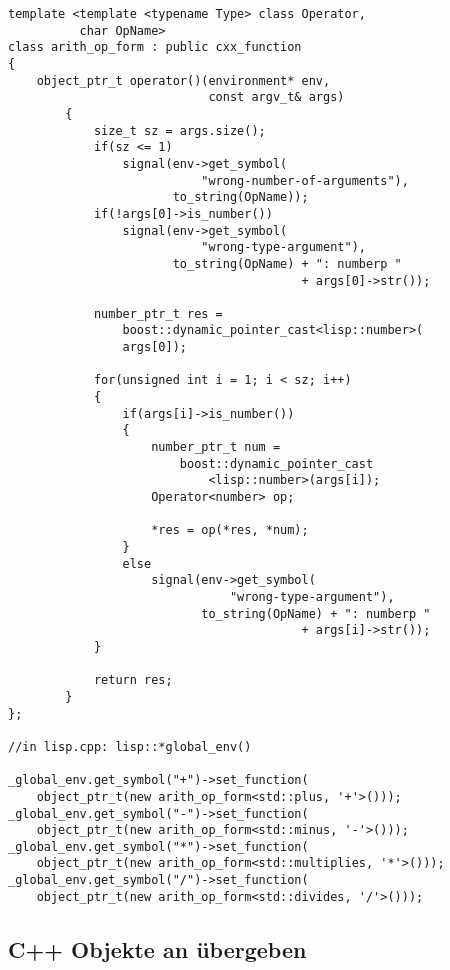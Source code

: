 \begin{lstlisting}[caption={Arithmetische Operatoren an Lisp übergeben}, label=lst:cxx_function]
template <template <typename Type> class Operator,
          char OpName>
class arith_op_form : public cxx_function
{
    object_ptr_t operator()(environment* env,
                            const argv_t& args)
        {
            size_t sz = args.size();
            if(sz <= 1)
                signal(env->get_symbol(
                           "wrong-number-of-arguments"),
                       to_string(OpName));
            if(!args[0]->is_number())
                signal(env->get_symbol(
                           "wrong-type-argument"),
                       to_string(OpName) + ": numberp "
                                         + args[0]->str());

            number_ptr_t res = 
                boost::dynamic_pointer_cast<lisp::number>(
                args[0]);

            for(unsigned int i = 1; i < sz; i++)
            {
                if(args[i]->is_number())
                {
                    number_ptr_t num =
                        boost::dynamic_pointer_cast
                            <lisp::number>(args[i]);
                    Operator<number> op;

                    *res = op(*res, *num);
                }
                else
                    signal(env->get_symbol(
                               "wrong-type-argument"),
                           to_string(OpName) + ": numberp "
                                         + args[i]->str());
            }

            return res;
        }
};

//in lisp.cpp: lisp::*global_env()

_global_env.get_symbol("+")->set_function(
    object_ptr_t(new arith_op_form<std::plus, '+'>()));
_global_env.get_symbol("-")->set_function(
    object_ptr_t(new arith_op_form<std::minus, '-'>()));
_global_env.get_symbol("*")->set_function(
    object_ptr_t(new arith_op_form<std::multiplies, '*'>()));
_global_env.get_symbol("/")->set_function(
    object_ptr_t(new arith_op_form<std::divides, '/'>()));
\end{lstlisting}

\subsection{C++ Objekte an \projectname{} übergeben}
\label{sec:cxx_object_interface}